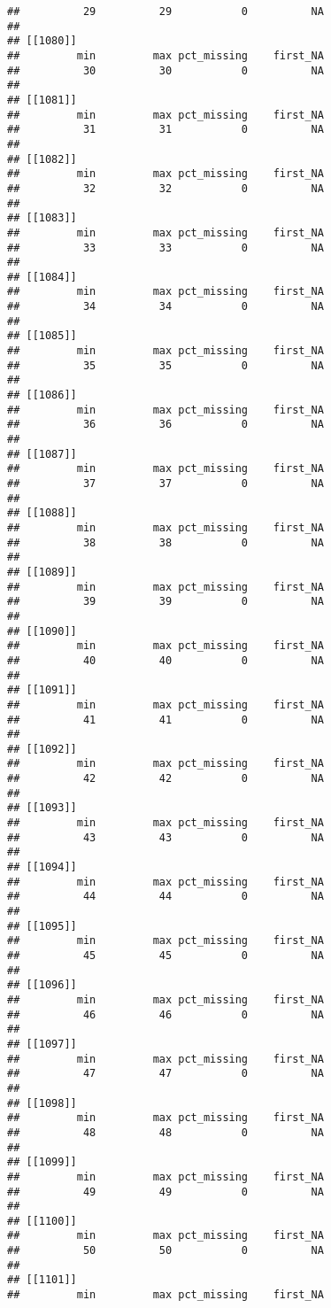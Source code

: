 \documentclass[
]{article}
\begin{document}
\begin{verbatim}
##          29          29           0          NA 
## 
## [[1080]]
##         min         max pct_missing    first_NA 
##          30          30           0          NA 
## 
## [[1081]]
##         min         max pct_missing    first_NA 
##          31          31           0          NA 
## 
## [[1082]]
##         min         max pct_missing    first_NA 
##          32          32           0          NA 
## 
## [[1083]]
##         min         max pct_missing    first_NA 
##          33          33           0          NA 
## 
## [[1084]]
##         min         max pct_missing    first_NA 
##          34          34           0          NA 
## 
## [[1085]]
##         min         max pct_missing    first_NA 
##          35          35           0          NA 
## 
## [[1086]]
##         min         max pct_missing    first_NA 
##          36          36           0          NA 
## 
## [[1087]]
##         min         max pct_missing    first_NA 
##          37          37           0          NA 
## 
## [[1088]]
##         min         max pct_missing    first_NA 
##          38          38           0          NA 
## 
## [[1089]]
##         min         max pct_missing    first_NA 
##          39          39           0          NA 
## 
## [[1090]]
##         min         max pct_missing    first_NA 
##          40          40           0          NA 
## 
## [[1091]]
##         min         max pct_missing    first_NA 
##          41          41           0          NA 
## 
## [[1092]]
##         min         max pct_missing    first_NA 
##          42          42           0          NA 
## 
## [[1093]]
##         min         max pct_missing    first_NA 
##          43          43           0          NA 
## 
## [[1094]]
##         min         max pct_missing    first_NA 
##          44          44           0          NA 
## 
## [[1095]]
##         min         max pct_missing    first_NA 
##          45          45           0          NA 
## 
## [[1096]]
##         min         max pct_missing    first_NA 
##          46          46           0          NA 
## 
## [[1097]]
##         min         max pct_missing    first_NA 
##          47          47           0          NA 
## 
## [[1098]]
##         min         max pct_missing    first_NA 
##          48          48           0          NA 
## 
## [[1099]]
##         min         max pct_missing    first_NA 
##          49          49           0          NA 
## 
## [[1100]]
##         min         max pct_missing    first_NA 
##          50          50           0          NA 
## 
## [[1101]]
##         min         max pct_missing    first_NA 

\end{verbatim}
\end{document}
